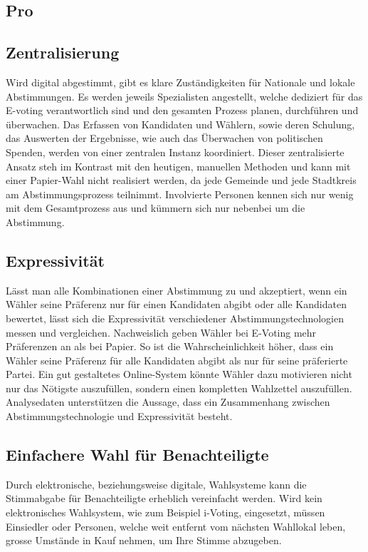 \documentclass[10pt,a4paper]{article} %
\begin{document}
\begin{multicols}{2}
\section*{Pro}
\subsection*{Zentralisierung}
Wird digital abgestimmt, gibt es klare Zuständigkeiten für Nationale und lokale Abstimmungen. Es werden jeweils Spezialisten angestellt, welche dediziert für das E-voting verantwortlich sind und den gesamten Prozess planen, durchführen und überwachen. Das Erfassen von Kandidaten und Wählern, sowie deren Schulung, das Auswerten der Ergebnisse, wie auch das Überwachen von politischen Spenden, werden von einer zentralen Instanz koordiniert.
Dieser zentralisierte Ansatz steh im Kontrast mit den heutigen, manuellen Methoden und kann mit einer Papier-Wahl nicht realisiert werden, da jede Gemeinde und jede Stadtkreis am Abstimmungsprozess teilnimmt. Involvierte Personen kennen sich nur wenig mit dem Gesamtprozess aus und kümmern sich nur nebenbei um die Abstimmung.
 
\subsection*{Expressivität}
Lässt man alle Kombinationen einer Abstimmung zu und akzeptiert, wenn ein Wähler seine Präferenz nur für einen Kandidaten abgibt oder alle Kandidaten bewertet, lässt sich die Expressivität verschiedener Abstimmungstechnologien messen und vergleichen.
Nachweislich geben Wähler bei E-Voting mehr Präferenzen an als bei Papier. So ist die Wahrscheinlichkeit höher, dass ein Wähler seine Präferenz für alle Kandidaten abgibt als nur für seine präferierte Partei.
Ein gut gestaltetes Online-System könnte Wähler dazu motivieren nicht nur das Nötigste auszufüllen, sondern einen kompletten Wahlzettel auszufüllen. Analysedaten unterstützen die Aussage, dass ein Zusammenhang zwischen Abstimmungstechnologie und Expressivität besteht.

 
\subsection*{Einfachere Wahl für Benachteiligte}
Durch elektronische, beziehungsweise digitale, Wahlsysteme kann die Stimmabgabe für Benachteiligte erheblich vereinfacht werden. Wird kein elektronisches Wahlsystem, wie zum Beispiel i-Voting, eingesetzt, müssen Einsiedler oder Personen, welche weit entfernt vom nächsten Wahllokal leben, grosse Umstände in Kauf nehmen, um Ihre Stimme abzugeben.


\end{multicols}
\end{document}
